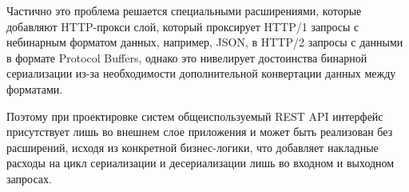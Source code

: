 Частично это проблема решается специальными расширениями, которые добавляют HTTP-прокси слой, который проксирует HTTP/1 запросы с небинарным форматом данных, например, JSON, в HTTP/2 запросы с данными в формате Protocol Buffers, однако это нивелирует достоинства бинарной сериализации из-за необходимости дополнительной конвертации данных между форматами.

Поэтому при проектировке систем общеиспользуемый REST API интерфейс присутствует лишь во внешнем слое приложения и может быть реализован без расширений, исходя из конкретной бизнес-логики, что добавляет накладные расходы на цикл сериализации и десериализации лишь во входном и выходном запросах.